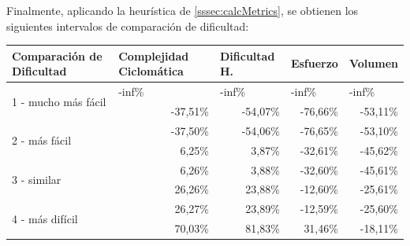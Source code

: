 \documentclass[letterpaper,12pt]{article}
\begin{document}
Finalmente, aplicando la heurística de \ref{sssec:calcMetrics}, se obtienen los siguientes intervalos de comparación de dificultad:
\begin{table}[H]
  \centering
  \begin{tabular}{|l|r|r|r|r|}
    \hline
    \textbf{Comparación de Dificultad}     & \multicolumn{1}{l|}{\textbf{Complejidad Ciclomática}} & \multicolumn{1}{l|}{\textbf{Dificultad H.}} & \multicolumn{1}{l|}{\textbf{Esfuerzo}} & \multicolumn{1}{l|}{\textbf{Volumen}} \\ \hline
    \multirow{2}{*}{1 - mucho más fácil}   & \multicolumn{1}{l|}{-inf\%}                           & \multicolumn{1}{l|}{-inf\%}                 & \multicolumn{1}{l|}{-inf\%}            & \multicolumn{1}{l|}{-inf\%}           \\ \cline{2-5}
                                           & -37,51\%                                              & -54,07\%                                    & -76,66\%                               & -53,11\%                              \\ \hline
    \multirow{2}{*}{2 - más fácil}         & -37,50\%                                              & -54,06\%                                    & -76,65\%                               & -53,10\%                              \\ \cline{2-5}
                                           & 6,25\%                                                & 3,87\%                                      & -32,61\%                               & -45,62\%                              \\ \hline
    \multirow{2}{*}{3 - similar}           & 6,26\%                                                & 3,88\%                                      & -32,60\%                               & -45,61\%                              \\ \cline{2-5}
                                           & 26,26\%                                               & 23,88\%                                     & -12,60\%                               & -25,61\%                              \\ \hline
    \multirow{2}{*}{4 - más difícil}       & 26,27\%                                               & 23,89\%                                     & -12,59\%                               & -25,60\%                              \\ \cline{2-5}
                                           & 70,03\%                                               & 81,83\%                                     & 31,46\%                                & -18,11\%                              \\ \hline

\end{tabular}
\end{table}
\end{document}
